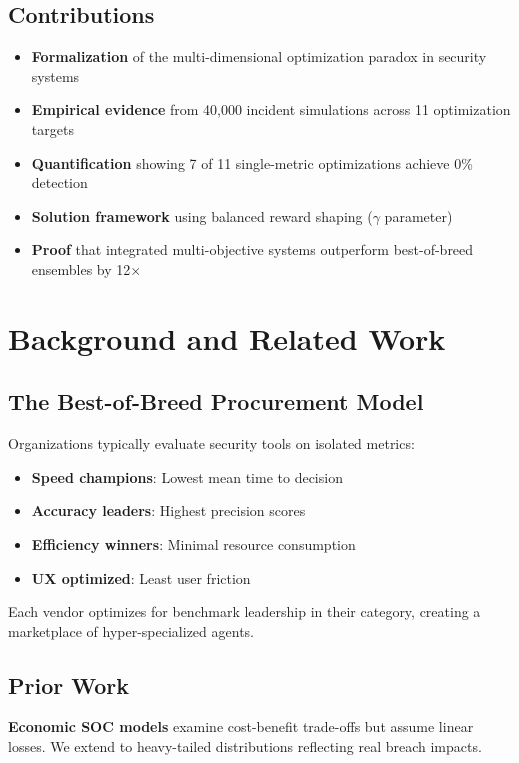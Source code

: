 \documentclass[11pt]{article}
\begin{document}
\subsection{Contributions}
\begin{itemize}
\item \textbf{Formalization} of the multi-dimensional optimization paradox in security systems
\item \textbf{Empirical evidence} from 40,000 incident simulations across 11 optimization targets
\item \textbf{Quantification} showing 7 of 11 single-metric optimizations achieve 0\% detection
\item \textbf{Solution framework} using balanced reward shaping ($\gamma$ parameter)
\item \textbf{Proof} that integrated multi-objective systems outperform best-of-breed ensembles by 12×
\end{itemize}

\section{Background and Related Work}

\subsection{The Best-of-Breed Procurement Model}
Organizations typically evaluate security tools on isolated metrics:
\begin{itemize}
\item \textbf{Speed champions}: Lowest mean time to decision
\item \textbf{Accuracy leaders}: Highest precision scores
\item \textbf{Efficiency winners}: Minimal resource consumption
\item \textbf{UX optimized}: Least user friction
\end{itemize}

Each vendor optimizes for benchmark leadership in their category, creating a marketplace of hyper-specialized agents.

\subsection{Prior Work}
\textbf{Economic SOC models} \cite{gonzalez2023soc} examine cost-benefit trade-offs but assume linear losses. We extend to heavy-tailed distributions reflecting real breach impacts.
\end{document}
